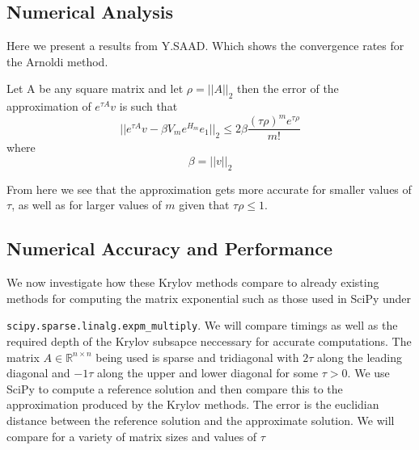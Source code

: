 \subsection{Numerical Analysis}
Here we present a results from Y.SAAD\cite{Saad1992}. Which shows the convergence rates for the Arnoldi method.

\begin{theorem}
    Let A be any square matrix and let \(\rho=||A||_2\) then the error of the approximation of \(e^{\tau A}v\) is such that
    \[ ||e^{\tau A}v - \beta V_m e^{H_m}e_1||_2 \leq 2\beta \frac{(\tau \rho)^m e^{\tau \rho}}{m!} \] where \[\beta = ||v||_2\]
\end{theorem}
From here we see that the approximation gets more accurate for smaller values of $\tau$, as well as for larger values of $m$ given that $\tau \rho\leq1$.

\subsection{Numerical Accuracy and Performance}
We now investigate how these Krylov methods compare to already existing methods for computing the matrix exponential such as those used in SciPy under 

\verb|scipy.sparse.linalg.expm_multiply|\cite{AlMohy2011}\cite{Higham2010}.
We will compare timings as well as the required depth of the Krylov subsapce neccessary for accurate computations.
The matrix $A \in \mathbb{R}^{n \times n}$ being used is sparse and tridiagonal with $2\tau$ along the leading diagonal and $-1\tau$ along the upper and lower diagonal for some $\tau > 0$.
We use SciPy to compute a reference solution and then compare this to the approximation produced by the Krylov methods.
The error is the euclidian distance between the reference solution and the approximate solution.
We will compare for a variety of matrix sizes and values of $\tau$

